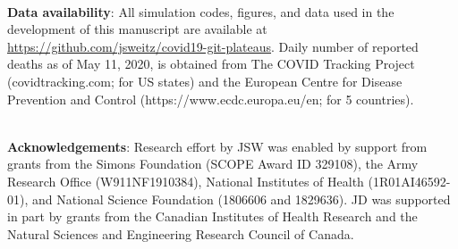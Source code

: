 \mbox{}\\
\noindent
\textbf{Data availability}:
All simulation codes, figures, and data used in the development of this manuscript are available at \url{https://github.com/jsweitz/covid19-git-plateaus}.
Daily number of reported deaths as of May 11, 2020, is obtained from The COVID Tracking Project (covidtracking.com; for US states) and the European Centre for Disease Prevention and Control (https://www.ecdc.europa.eu/en; for 5 countries).

\mbox{}\\
\noindent
\textbf{Acknowledgements}:
Research effort by JSW was enabled
by support from grants from the Simons Foundation (SCOPE Award ID 329108), the Army Research 
Office (W911NF1910384), National Institutes of Health (1R01AI46592-01), 
and National Science Foundation (1806606 and 1829636). JD was supported in part by 
grants from the Canadian Institutes of Health Research and the Natural Sciences and Engineering Research Council of Canada.
